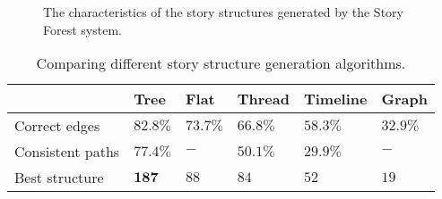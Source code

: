 \begin{figure*}[t]
                        \centering
                \hspace{-3mm}
                        \hspace{-3mm}
                        \vspace{-3mm}
                \caption{The characteristics of the story structures  generated by the  Story Forest system.}
                \label{fig:analysisTree}
\vspace{-4mm}
\end{figure*}



\begin{table}
  \caption{Comparing different story structure generation algorithms.}
  \label{tab:structureResult}
  \begin{tabular}{llllll}
    \toprule
     & Tree & Flat & Thread & Timeline & Graph\\
    \midrule
    Correct edges & $\mathbf{82.8\%}$ & $73.7\%$ & $66.8\%$ & $58.3\%$ & $32.9\%$ \\
    Consistent paths & $\mathbf{77.4\%}$ & $-$ & $50.1\%$ & $29.9\%$ & $-$\\
    Best structure & $\mathbf{187}$ & $88$ & $84$ & $52$ & $19$\\
    \bottomrule
  \end{tabular}
  \vspace{-3mm}
\end{table}

  

